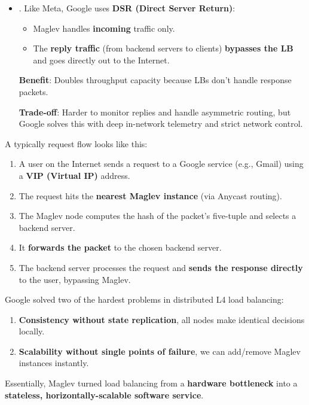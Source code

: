 \begin{itemize}
    \item {}. Like Meta, Google uses \textbf{DSR (Direct Server Return)}:
    \begin{itemize}
        \item Maglev handles \textbf{incoming} traffic only.
        \item The \textbf{reply traffic} (from backend servers to clients) \textbf{bypasses the LB} and goes directly out to the Internet.
    \end{itemize}
    \textcolor{Green3}{} \textcolor{Green3}{\textbf{Benefit}}: Doubles throughput capacity because LBs don't handle response packets.

    \textcolor{Red2}{} \textcolor{Red2}{\textbf{Trade-off}}: Harder to monitor replies and handle asymmetric routing, but Google solves this with deep in-network telemetry and strict network control.
\end{itemize}
A typically request flow looks like this:
\begin{enumerate}
    \item A user on the Internet sends a request to a Google service (e.g., Gmail) using a \textbf{VIP (Virtual IP)} address.
    \item The request hits the \textbf{nearest Maglev instance} (via Anycast routing).
    \item The Maglev node computes the hash of the packet's five-tuple and selects a backend server.
    \item It \textbf{forwards the packet} to the chosen backend server.
    \item The backend server processes the request and \textbf{sends the response directly} to the user, bypassing Maglev.
\end{enumerate}
Google solved two of the hardest problems in distributed L4 load balancing:
\begin{enumerate}
    \item \textbf{Consistency without state replication}, all nodes make identical decisions locally.
    \item \textbf{Scalability without single points of failure}, we can add/remove Maglev instances instantly.
\end{enumerate}
Essentially, Maglev turned load balancing from a \textbf{hardware bottleneck} into a \textbf{stateless, horizontally-scalable software service}.


